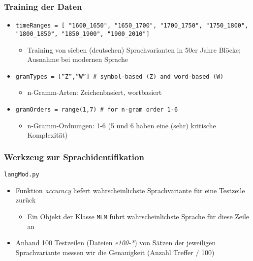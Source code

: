 \documentclass[t]{beamer} %
\begin{document}
\begin{frame}
  \frametitle{Training der Daten}
  \begin{itemize}
  \item \texttt{timeRanges = [ "1600\_1650", "1650\_1700", "1700\_1750", "1750\_1800", "1800\_1850", "1850\_1900", "1900\_2010"]}
  	\begin{itemize}
  	\item Training von sieben (deutschen) Sprachvarianten in 50er Jahre Blöcke; Ausnahme bei modernen Sprache
  	\end{itemize}\pause
  \item \texttt{gramTypes = [''Z'',''W''] \# symbol-based (Z) and word-based (W)}
  	\begin{itemize}
   	\item n-Gramm-Arten: Zeichenbasiert, wortbasiert
  	\end{itemize}\pause
  \item \texttt{gramOrders = range(1,7) \# for n-gram order 1-6}
  	\begin{itemize}
   	\item n-Gramm-Ordnungen: 1-6 (5 und 6 haben eine (sehr) kritische Komplexität)
  	\end{itemize}
  \end{itemize}  
\end{frame}


% 
\begin{frame}
  \frametitle{Werkzeug zur Sprachidentifikation}
  \texttt{langMod.py}
  \begin{itemize}
  \item Funktion \emph{accuracy} liefert wahrscheinlichste Sprachvariante für eine Testzeile zurück
   \begin{itemize}
    \item Ein Objekt der Klasse \texttt{MLM} führt wahrscheinlichste Sprache für diese Zeile an
   \end{itemize}\pause
  \item Anhand 100 Testzeilen (Dateien \emph{e100-*}) von Sätzen der jeweiligen Sprachvariante messen wir die Genauigkeit (Anzahl Treffer / 100)
  \end{itemize}  
\end{frame}
\end{document}
